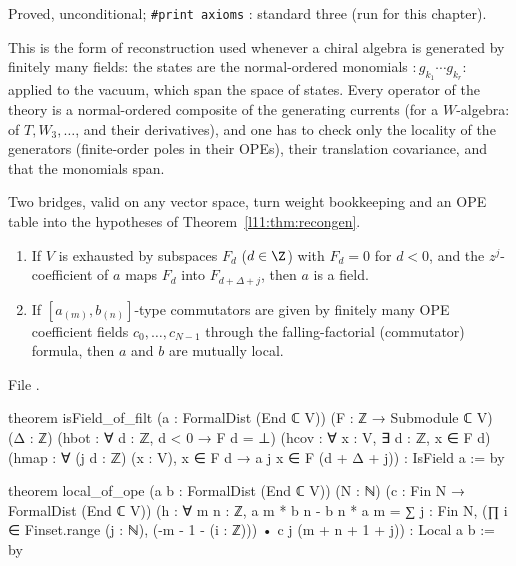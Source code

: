 \begin{status}
Proved, unconditional; \texttt{\#print axioms} \allowbreak{}\allowbreak{}\allowbreak{}\allowbreak{}: standard three (run for this
chapter).
\end{status}

\begin{physics}
This is the form of reconstruction used whenever a chiral algebra is generated by finitely many fields: the states are the
normal-ordered monomials ${:}g_{k_1}\cdots g_{k_r}{:}$ applied to the vacuum, which span the space of states. Every operator of the
theory is a normal-ordered composite of the generating currents (for a $W$-algebra: of $T,W_3,\dots$, and their derivatives), and
one has to check only the locality of the generators (finite-order poles in their OPEs), their translation covariance, and that
the monomials span.
\end{physics}

Two bridges, valid on any vector space, turn weight bookkeeping and an OPE table into the hypotheses of
Theorem~\ref{l11:thm:recongen}.

\begin{theorem}\label{l11:thm:bridges}
\begin{enumerate}
\item If $V$ is exhausted by subspaces $F_d$ ($d\in\Z$) with $F_d = 0$ for $d<0$, and the $z^j$-coefficient of $a$ maps $F_d$ into
  $F_{d+\Delta+j}$, then $a$ is a field.
\item If $[a_{(m)},b_{(n)}]$-type commutators are given by finitely many OPE coefficient fields $c_0,\dots,c_{N-1}$ through the
  falling-factorial (commutator) formula, then $a$ and $b$ are mutually local.
\end{enumerate}
\end{theorem}
\noindent File .
\begin{leancode}
theorem isField_of_filt (a : FormalDist (End ℂ V)) (F : ℤ → Submodule ℂ V) (Δ : ℤ)
    (hbot : ∀ d : ℤ, d < 0 → F d = ⊥)
    (hcov : ∀ x : V, ∃ d : ℤ, x ∈ F d)
    (hmap : ∀ (j d : ℤ) (x : V), x ∈ F d → a j x ∈ F (d + Δ + j)) :
    IsField a := by

theorem local_of_ope (a b : FormalDist (End ℂ V)) (N : ℕ) (c : Fin N → FormalDist (End ℂ V))
    (h : ∀ m n : ℤ, a m * b n - b n * a m
        = ∑ j : Fin N, (∏ i ∈ Finset.range (j : ℕ), (-m - 1 - (i : ℤ))) • c j (m + n + 1 + j)) :
    Local a b := by
\end{leancode}

